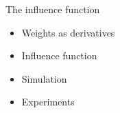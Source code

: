 


\begin{frame}{The influence function}

\begin{itemize}
    \item Weights as derivatives
    \item Influence function
    \item Simulation
    \item Experiments
\end{itemize}

\end{frame}



